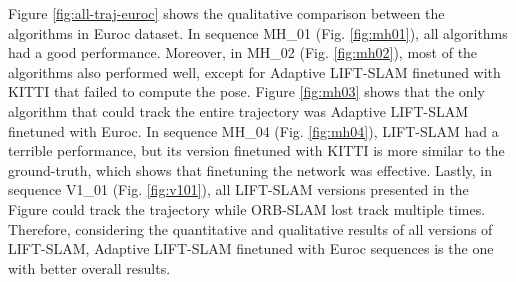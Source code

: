 \begin{table}[!h]
\centering
{}

\caption{ATE (m) comparison between ORB-SLAM and all versions of LIFT-SLAM in the Euroc dataset. We fill with "X" the sequences unavailable due to tracking failure, and with "-" sequences, we do not execute the algorithm to avoid biased results. We highlight the smaller average in each metric.}
\label{tab:all-results-euroc}
\end{table}

Figure \ref{fig:all-traj-euroc} shows the qualitative comparison between the algorithms in Euroc dataset. %
In sequence MH\_01 (Fig. \ref{fig:mh01}), all algorithms had a good performance. Moreover, in MH\_02 (Fig. \ref{fig:mh02}), most of the algorithms also performed well, except for Adaptive LIFT-SLAM finetuned with KITTI that failed to compute the pose. Figure \ref{fig:mh03} shows that the only algorithm that could track the entire trajectory was Adaptive LIFT-SLAM finetuned with Euroc. In sequence MH\_04 (Fig. \ref{fig:mh04}), LIFT-SLAM had a terrible performance, but its version finetuned with KITTI is more similar to the ground-truth, which shows that finetuning the network was effective. Lastly, in sequence V1\_01 (Fig. \ref{fig:v101}), all LIFT-SLAM versions presented in the Figure could track the trajectory while ORB-SLAM lost track multiple times. Therefore, considering the quantitative and qualitative results of all versions of LIFT-SLAM, Adaptive LIFT-SLAM finetuned with Euroc sequences is the one with better overall results.


